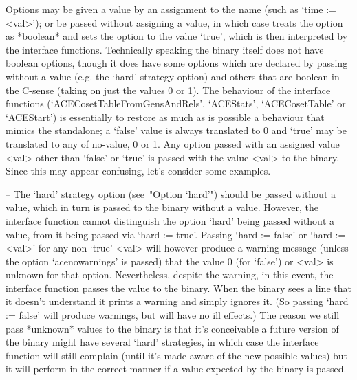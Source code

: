 
Options may be given a value by an assignment to  the  name  (such  as
`time := <val>'); or be passed without assigning  a  value,  in  which
case {\GAP} treats the option as *boolean* and sets the option to  the
value `true', which  is  then  interpreted  by  the  {\ACE}  interface
functions. Technically speaking the {\ACE} binary itself does not have
boolean options, though it does have some options which  are  declared
by passing without a value  (e.g.  the  `hard'  strategy  option)  and
others that are boolean in the C-sense (taking on just the values 0 or
1).   The   behaviour    of    the    {\ACE}    interface    functions
(`ACECosetTableFromGensAndRels',   `ACEStats',   `ACECosetTable'    or
`ACEStart') is essentially  to  restore  as  much  as  is  possible  a
behaviour that mimics the {\ACE} standalone; a `false' value is always
translated to 0 and `true' may be translated to any of no-value, 0  or
1. Any option passed with an assigned value <val> other  than  `false'
or `true' is passed with the value <val> to the {\ACE}  binary.  Since
this may appear confusing, let's consider some examples.

\beginlist

\item{--} The `hard' strategy option (see~"Option `hard'")  should  be
passed without a value, which in turn is passed to the  {\ACE}  binary
without  a  value.  However,  the  {\ACE}  interface  function  cannot
distinguish the option `hard' being passed without a  value,  from  it
being passed via `hard := true'. Passing `hard := false' or  `hard  :=
<val>' for any non-`true' <val> will however produce a warning message
(unless the option `acenowarnings' is passed) that the  value  0  (for
`false') or <val> is unknown for that  option.  Nevertheless,  despite
the warning, in this event, the {\ACE} interface function  passes  the
value to the {\ACE} binary. When the {\ACE} binary sees a line that it
doesn't understand it prints a warning  and  simply  ignores  it.  (So
passing `hard := false' will produce warnings, but will  have  no  ill
effects.) The reason we still pass  *unknown*  values  to  the  {\ACE}
binary is that it's conceivable a future version of the {\ACE}  binary
might have  several  `hard'  strategies,  in  which  case  the  {\ACE}
interface function will still complain (until it's made aware  of  the
new possible values) but it will perform in the correct  manner  if  a
value expected by the {\ACE} binary is passed.

